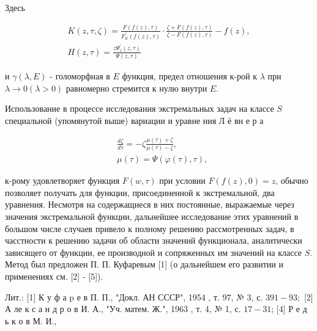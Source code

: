 \documentclass[10pt]{article}
\begin{document}
Здесь



\[

\begin{gathered}

K(z, \tau, \zeta)=\frac{F(f(z), \tau)}{F_{w}^{\prime}(f(z), \tau)} \cdot \frac{\zeta+F(f(z), \tau)}{\zeta-F(f(z), \tau)}-f(z), \\

H(z, \tau)=\frac{z \Psi_{z}^{\prime}(z, \tau)}{\Psi(z, \tau)}

\end{gathered}

\]



и $\gamma(\lambda, E)$ - голоморфная в $E$ функция, предел отношения к-рой к $\lambda$ при $\lambda \rightarrow 0(\lambda>0)$ равномерно стремится к нулю внутри $E$.



Использование в процессе исследования экстремальных задач на классе $S$ специальной (упомянутой выше) вариации и уравне ния Л ё вн е р а



\[

\begin{aligned}

& \frac{d \zeta}{d \tau}=-\zeta \frac{\mu(\tau)+\zeta}{\mu(\tau)-\zeta}, \\

& \mu(\tau)=\Psi(\varphi(\tau), \tau),

\end{aligned}

\]



к-рому удовлетворяет функция $F(w, \tau)$ при условии $F(f(z), 0)=z$, обычно позволяет получать для функции, присоединенной к экстремальной, два уравнения. Несмотря на содержащиеся в них постоянные, выражаемые через значения экстремальной функции, дальнейшее исследование этих уравнений в большом числе случаев привело к полному решению рассмотренных задач, в часстности к решению задачи об области значений функционала, аналитически зависящего от функции, ее производной и сопряженных им значений на классе $S$. Метод был предложен П. П. Куфаревым [1] (о дальнейшем его развитии и применениях см. [2] - [5]).



Лит.: [1] К у ф а p е в П. П., "Докл. АН СССР", 1954 , т. 97, № 3, с. $391-93 ;$ [2] А ле к с а н д р о в И. А., "Уч. матем. Ж.", 1963 , т. 4, № 1, с. $17-31$; [4] Р е д ь к о в М. И.,
\end{document}
